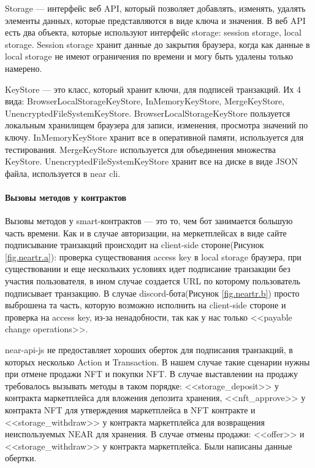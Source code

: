 \begin{definition}
    Storage --- интерфейс веб API, который позволяет добавлять, изменять, удалять элементы данных, которые представляются в виде ключа и значения\cite{webapistorage}. В веб API есть два объекта, которые используют интерфейс storage: session storage, local storage\cite{webapilocalstorage}. Session storage хранит данные до закрытия браузера, когда как данные в local storage не имеют ограничения по времени и могу быть удалены только намерено.
\end{definition}

\begin{definition}
    KeyStore\cite{nearclasskeystore} --- это класс, который хранит ключи, для подписей транзакций. Их 4 вида: BrowserLocalStorageKeyStore, InMemoryKeyStore, MergeKeyStore, UnencryptedFileSystemKeyStore. BrowserLocalStorageKeyStore пользуется локальным хранилищем браузера для записи, изменения, просмотра значений по ключу. InMemoryKeyStore хранит все в оперативной памяти, используется для тестирования. MergeKeyStore используется для объединения множества KeyStore. UnencryptedFileSystemKeyStore хранит все на диске в виде JSON файла, используется в near cli\cite{nearcli}.
\end{definition}

\paragraph{Вызовы методов у контрактов}

Вызовы методов у smart-контрактов --- это то, чем бот занимается большую часть времени. Как и в случае авторизации, на меркетплейсах в виде сайте подписывание транзакций происходит на client-side стороне(Рисунок {\color{blue} \ref{fig.neartr.a}}): проверка существования access key в local storage браузера, при существовании и еще нескольких условиях идет подписание транзакции без участия пользователя, в ином случае создается URL по которому пользователь подписывает транзакцию. В случае discord-бота(Рисунок {\color{blue} \ref{fig.neartr.b}}) просто выброшена та часть, которую возможно исполнить на client-side стороне и проверка на access key, из-за ненадобности, так как у нас только <<payable change operations>>.

near-api-js не предоставляет хороших оберток для подписания транзакций, в которых несколько Action и Transaction. В нашем случае такие сценарии нужны при отмене продажи NFT и покупки NFT. В случае выставлении на продажу требовалось вызывать методы в таком порядке: <<storage\_deposit>> у контракта маркетплейса для вложения депозита хранения, <<nft\_approve>> у контракта NFT для утверждения маркетплейса в NFT контракте и <<storage\_withdraw>> у контракта маркетплейса для возвращения неиспользуемых NEAR для хранения. В случае отмены продажи: <<offer>> и <<storage\_withdraw>> у контракта маркетплейса. Были написаны данные обертки.

